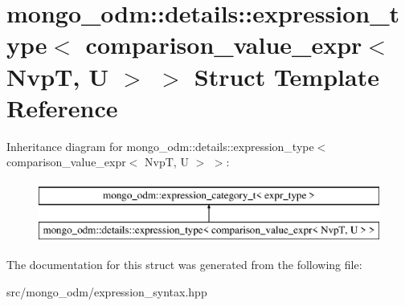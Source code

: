 \hypertarget{structmongo__odm_1_1details_1_1expression__type_3_01comparison__value__expr_3_01NvpT_00_01U_01_4_01_4}{}\section{mongo\+\_\+odm\+:\+:details\+:\+:expression\+\_\+type$<$ comparison\+\_\+value\+\_\+expr$<$ NvpT, U $>$ $>$ Struct Template Reference}
\label{structmongo__odm_1_1details_1_1expression__type_3_01comparison__value__expr_3_01NvpT_00_01U_01_4_01_4}
Inheritance diagram for mongo\+\_\+odm\+:\+:details\+:\+:expression\+\_\+type$<$ comparison\+\_\+value\+\_\+expr$<$ NvpT, U $>$ $>$\+:\begin{figure}[H]
\begin{center}
\leavevmode
\includegraphics[height=2.000000cm]{structmongo__odm_1_1details_1_1expression__type_3_01comparison__value__expr_3_01NvpT_00_01U_01_4_01_4}
\end{center}
\end{figure}


The documentation for this struct was generated from the following file\+:\begin{DoxyCompactItemize}
\item 
src/mongo\+\_\+odm/expression\+\_\+syntax.\+hpp\end{DoxyCompactItemize}
